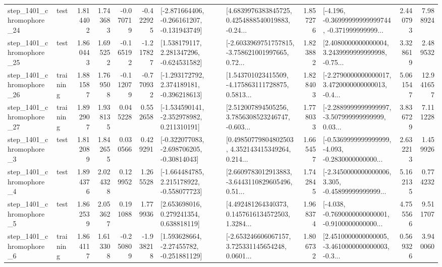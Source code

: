 \begin{tabular}{llrrrrllrlrr}
 step\_1401\_chromophore\_24 &      test &      1.814402 &    1.743683 &     -0.070719 & -0.422925 &  [-2.871664406, -0.266161207, -0.131943749] &  [4.6839976383845725, 0.4254888540019883, -0.24... &       1.857276 &  [-4.196, -0.36999999999999744, -0.371999999999... &            2.440793 &          7.988924 \\
 step\_1401\_chromophore\_25 &      test &      1.860443 &    1.695252 &     -0.165192 & -1.217827 &    [1.538179117, 2.281347296, -0.624531582] &  [-2.6033969751757815, -3.758621001997665, 0.72... &       1.823882 &  [2.4080000000000004, 3.2439999999999998, -0.75... &            3.328619 &          2.489532 \\
 step\_1401\_chromophore\_26 &  training &      1.881587 &    1.769508 &     -0.112079 & -0.770932 &   [-1.293172792, 2.374189181, -0.396218613] &  [1.543701023415509, -4.175863111728875, 0.5813... &       1.828403 &  [-2.2790000000000017, 3.4720000000000013, -0.4... &            5.061547 &         12.941657 \\
 step\_1401\_chromophore\_27 &  training &      1.892907 &    1.938135 &      0.045228 &  0.552658 &   [-1.534590141, -2.352978982, 0.211310191] &  [2.512007894505256, 3.7856308523246747, -0.603... &       1.778033 &  [-2.2889999999999997, -3.507999999999999, 0.03... &            3.836729 &          7.111228 \\
  step\_1401\_chromophore\_3 &      test &      1.812089 &    1.842655 &      0.030566 &  0.429291 &   [-0.322077083, -2.698706205, -0.30814043] &  [0.49850779804802503, 4.352143415349264, 0.214... &       1.665457 &  [-0.5369999999999999, -4.093, -0.2830000000000... &            2.632213 &          1.459926 \\
  step\_1401\_chromophore\_4 &      test &      1.894376 &    2.024328 &      0.129952 &  1.265528 &   [-1.664484785, 2.215178922, -0.558077723] &  [2.6609783012913883, -3.6443110829605496, 0.51... &       1.742845 &  [-2.3450000000000006, 3.305, -0.45899999999999... &            5.162135 &          0.774232 \\
  step\_1401\_chromophore\_5 &      test &      1.862539 &    2.053627 &      0.191088 &  1.779936 &     [2.653698016, 0.279241354, 0.638818119] &  [4.492481264340373, 0.1457616134572503, 1.3284... &       1.968374 &  [-4.038, -0.7690000000000001, -0.9100000000000... &            4.755566 &          9.511707 \\
  step\_1401\_chromophore\_6 &  training &      1.864117 &    1.613308 &     -0.250809 & -1.938218 &    [1.593628664, -2.27455782, -0.251881129] &  [-2.653246606067157, 3.725331145654248, 0.0601... &       1.806732 &  [2.4510000000000005, -3.4610000000000003, -0.3... &            0.569326 &          3.940060 \\

\end{tabular}
